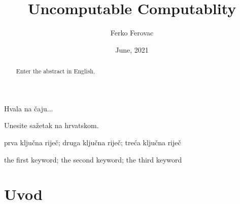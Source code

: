 \documentclass[diplomskirad]{fer}
\title{Uncomputable Computablity}
\author{Ferko Ferovac}
\date{June, 2021}
\begin{document}
\maketitle






\begin{zahvale}
  Hvala na čaju...
\end{zahvale}


\mainmatter



\begin{sazetak}
  Unesite sažetak na hrvatskom.

  \blindtext
\end{sazetak}

\begin{kljucnerijeci}
  prva ključna riječ; druga ključna riječ; treća ključna riječ
\end{kljucnerijeci}


\begin{abstract}
  Enter the abstract in English.
  
  \blindtext 
\end{abstract}

\begin{keywords}
  the first keyword; the second keyword; the third keyword
\end{keywords}


\tableofcontents


\chapter{Uvod}
\label{pog:uvod}
\end{document}
